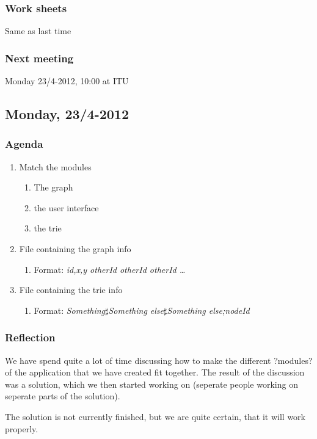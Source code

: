 \documentclass[a4paper,11pt]{article}
\begin{document}
\subsubsection*{Work sheets}
Same as last time

\subsubsection*{Next meeting}
Monday 23/4-2012, 10:00 at ITU


\pagebreak
\subsection{Monday, 23/4-2012}

\subsubsection*{Agenda}
\begin{enumerate}
	\item Match the modules
	\begin{enumerate}
		\item The graph
		\item the user interface
		\item the trie
	\end{enumerate}
	\item File containing the graph info
	\begin{enumerate}
		\item Format: \textsl{id,x,y otherId otherId otherId \ldots}
	\end{enumerate}
	\item File containing the trie info
	\begin{enumerate}
		\item Format: \textsl{Something$\sharp$Something else$\sharp$Something else;nodeId}
	\end{enumerate}
\end{enumerate}

\subsubsection*{Reflection}
We have spend quite a lot of time discussing how to make the different ?modules? of the application that we have created fit together.
The result of the discussion was a solution, which we then started working on (seperate people working on seperate parts of the solution).

The solution is not currently finished, but we are quite certain, that it will work properly.
\end{document}
